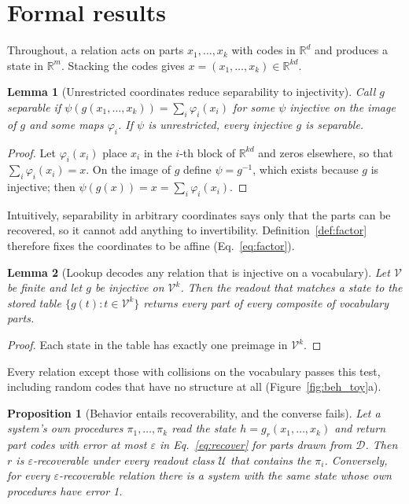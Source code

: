 \documentclass[10pt]{article}
\theoremstyle{plain}
\newtheorem{proposition}{Proposition}
\newtheorem{lemma}{Lemma}
\theoremstyle{remark}
\newcommand{\R}{\mathbb{R}}
\newcommand{\U}{\mathcal{U}}
\newcommand{\D}{\mathcal{D}}
\newcommand{\Voc}{\mathcal{V}}
\begin{document}
\section{Formal results}
\label{app:proofs}

Throughout, a relation acts on parts $x_1, \ldots, x_k$ with codes in $\R^d$ and produces a state in $\R^m$. Stacking the codes gives $x = (x_1, \ldots, x_k) \in \R^{kd}$.



\begin{lemma}[Unrestricted coordinates reduce separability to injectivity]
\label{lem:psi}
Call $g$ separable if $\psi(g(x_1, \ldots, x_k)) = \sum_i \varphi_i(x_i)$ for some $\psi$ injective on the image of $g$ and some maps $\varphi_i$. If $\psi$ is unrestricted, every injective $g$ is separable.
\end{lemma}

\begin{proof}
Let $\varphi_i(x_i)$ place $x_i$ in the $i$-th block of $\R^{kd}$ and zeros elsewhere, so that $\sum_i \varphi_i(x_i) = x$. On the image of $g$ define $\psi = g^{-1}$, which exists because $g$ is injective; then $\psi(g(x)) = x = \sum_i \varphi_i(x_i)$.
\end{proof}

\noindent
Intuitively, separability in arbitrary coordinates says only that the parts can be recovered, so it cannot add anything to invertibility. Definition~\ref{def:factor} therefore fixes the coordinates to be affine (Eq.~\ref{eq:factor}).

\begin{lemma}[Lookup decodes any relation that is injective on a vocabulary]
\label{lem:lookup}
Let $\Voc$ be finite and let $g$ be injective on $\Voc^k$. Then the readout that matches a state to the stored table $\{g(t) : t \in \Voc^k\}$ returns every part of every composite of vocabulary parts.
\end{lemma}

\begin{proof}
Each state in the table has exactly one preimage in $\Voc^k$.
\end{proof}

\noindent
Every relation except those with collisions on the vocabulary passes this test, including random codes that have no structure at all (Figure~\ref{fig:beh_toy}a).



\begin{proposition}[Behavior entails recoverability, and the converse fails]
\label{prop:subset}
Let a system's own procedures $\pi_1, \ldots, \pi_k$ read the state $h = g_r(x_1, \ldots, x_k)$ and return part codes with error at most $\varepsilon$ in Eq.~\eqref{eq:recover} for parts drawn from $\D$. Then $r$ is $\varepsilon$-recoverable under every readout class $\U$ that contains the $\pi_i$. Conversely, for every $\varepsilon$-recoverable relation there is a system with the same state whose own procedures have error 1.
\end{proposition}
\end{document}
